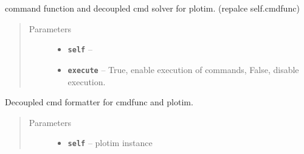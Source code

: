 \documentclass[letterpaper,10pt,english]{sphinxmanual}
\begin{document}
\begin{fulllineitems}
\begin{fulllineitems}
\begin{quote}
\begin{description}
\end{description}\end{quote}

\end{fulllineitems}


\begin{fulllineitems}
\label{RRtoolbox.lib:RRtoolbox.lib.plotter.plotim.cmdfunc}
command function and decoupled cmd solver for plotim. (repalce self.cmdfunc)
\begin{quote}\begin{description}
\item[{Parameters}] \leavevmode\begin{itemize}
\item {} 
\textbf{\texttt{self}} -- 

\item {} 
\textbf{\texttt{execute}} -- True, enable execution of commands, False, disable execution.

\end{itemize}

\end{description}\end{quote}

\end{fulllineitems}


\begin{fulllineitems}
\label{RRtoolbox.lib:RRtoolbox.lib.plotter.plotim.errorbackground}
\end{fulllineitems}


\begin{fulllineitems}
\label{RRtoolbox.lib:RRtoolbox.lib.plotter.plotim.formatcmd}
Decoupled cmd formatter for cmdfunc and plotim.
\begin{quote}\begin{description}
\item[{Parameters}] \leavevmode\begin{itemize}
\item {} 
\textbf{\texttt{self}} -- plotim instance


\end{itemize}
\end{description}
\end{quote}
\end{fulllineitems}
\end{fulllineitems}
\end{document}
